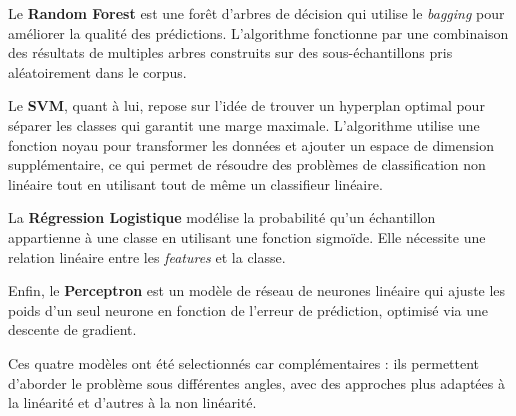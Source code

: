 \par Le \textbf{Random Forest} est une forêt d'arbres de décision qui utilise le \textit{bagging} pour améliorer la qualité des prédictions. L'algorithme fonctionne par une combinaison des résultats de multiples arbres construits sur des sous-échantillons pris aléatoirement dans le corpus.

\par Le \textbf{SVM}, quant à lui, repose sur l'idée de trouver un hyperplan optimal pour séparer les classes qui garantit une marge maximale. L'algorithme utilise une fonction noyau pour transformer les données et ajouter un espace de dimension supplémentaire, ce qui permet de résoudre des problèmes de classification non linéaire tout en utilisant tout de même un classifieur linéaire.

\par La \textbf{Régression Logistique} modélise la probabilité qu'un échantillon appartienne à une classe en utilisant une fonction sigmoïde. Elle nécessite une relation linéaire entre les \textit{features} et la classe.

\par Enfin, le \textbf{Perceptron} est un modèle de réseau de neurones linéaire qui ajuste les poids d'un seul neurone en fonction de l'erreur de prédiction, optimisé via une descente de gradient.

\par Ces quatre modèles ont été selectionnés car complémentaires : ils permettent d'aborder le problème sous différentes angles, avec des approches plus adaptées à la linéarité et d'autres à la non linéarité.



